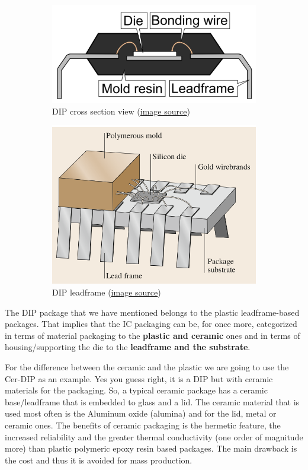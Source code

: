 \documentclass[final]{cubedoc}
\begin{document}
	\begin{figure}[h!]
		\centering
		\begin{subfigure}{.5\textwidth}
			\centering
			\includegraphics[width=0.7\linewidth]{docs/pdip.png}
			\caption{DIP cross section view \small{(\href{https://web.archive.org/web/20200818152711/https://commons.wikimedia.org/w/index.php?title=File:DIP_package_sideview.PNG&oldid=131332920}{image source})}}
			\label{fig:sub1}
		\end{subfigure}%
		\begin{subfigure}{.5\textwidth}
			\centering
			\includegraphics[keepaspectratio, width=0.7\linewidth, height=.4\textheight]{docs/dip_leadframe.png}
			\caption{DIP leadframe \small{(\href{https://web.archive.org/web/20200818152844/https://link.springer.com/chapter/10.1007/978-3-319-48933-9_530}{image source})}}
			\label{fig:sub2}
		\end{subfigure}
		\caption{}
		\label{fig:test}
	\end{figure}
	
	The DIP package that we have mentioned belongs to the plastic leadframe-based packages. That implies that the IC packaging can be, for once more, categorized in terms of material packaging to the \textbf{plastic and ceramic} ones and in terms of housing/supporting the die to the \textbf{leadframe and the substrate}.
	
	For the difference between the ceramic and the plastic we are going to use the Cer-DIP as an example. Yes you guess right, it is a DIP but with ceramic materials for the packaging. So, a typical ceramic package has a ceramic base/leadframe that is embedded to glass and a lid. The ceramic material that is used most often is the Aluminum oxide (alumina) and for the lid, metal or ceramic ones. The benefits of ceramic packaging is the hermetic feature, the increased reliability and the greater thermal conductivity (one order of magnitude more) than plastic polymeric epoxy resin based packages. The main drawback is the cost and thus it is avoided for mass production. 
	
\end{document}
